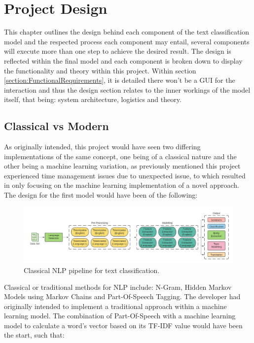 \chapter{Project Design}

This chapter outlines the design behind each component of the text classification model and the respected process each component may entail, several components will execute more than one step to achieve the desired result. The design is reflected within the final model and each component is broken down to display the functionality and theory within this project. Within section \ref{section:FunctionalRequirements}, it is detailed there won’t be a GUI for the interaction and thus the design section relates to the inner workings of the model itself, that being: system architecture, logistics and theory.

\section{Classical vs Modern}

As originally intended, this project would have seen two differing implementations of the same concept, one being of a classical nature and the other being a machine learning variation, as previously mentioned this project experienced time management issues due to unexpected issue, to which resulted in only focusing on the machine learning implementation of a novel approach. The design for the first model would have been of the following:

\begin{figure}[H]
    \centering
    \includegraphics[width=\textwidth]{figures/chapter-5/ClassicalNLP.pdf}
    \caption[ClassicalNLP]{Classical NLP pipeline for text classification.
    \label{fig:ClassicalNLP}}
\end{figure}

Classical or traditional methods for NLP include: N-Gram, Hidden Markov Models using Markov Chains and Part-Of-Speech Tagging. The developer had originally intended to implement a traditional approach within a machine learning model. The combination of Part-Of-Speech with a machine learning model to calculate a word’s vector based on its TF-IDF value would have been the start, such that:

